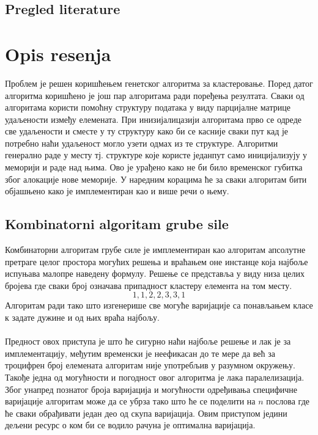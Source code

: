 \documentclass{article}
\begin{document}
\subsection{Pregled literature}

\newpage
\section{Opis resenja}
Проблем је решен коришћењем генетског алгоритма за кластеровање. Поред датог алгоритма коришћено је још пар алгоритама ради поређења резултата. Сваки од алгоритама користи помоћну структуру података у виду парцијалне матрице удаљености између елемената. При инизијалицазији алгоритама прво се одреде све удаљености и сместе у ту структуру како би се касније сваки пут кад је потребно наћи удаљеност могло узети одмах из те структуре. Алгоритми генерално раде у месту тј. структуре које користе једанпут само иницијализују у меморији и раде над њима. Ово је урађено како не би било временског губитка због алокације нове меморије. У наредним корацима ће за сваки алгоритам бити објашњено како је имплементиран као и више речи о њему.

\subsection{Kombinatorni algoritam grube sile}
Комбинаторни алгоритам грубе силе је имплементиран као алгоритам апсолутне претраге целог простора могућих решења и враћањем оне инстанце која најбоље испуњава малопре наведену формулу.
Решење се представља у виду низа целих бројева где сваки број означава припадност кластеру елемента на том месту.
\begin{displaymath}
1,1,2,2,3,3,1
\end{displaymath}
Алгоритам ради тако што изгенерише све могуће варијације са понављањем класе к задате дужине и од њих враћа најбољу.
\\\\Предност овох приступа је што ће сигурно наћи најбоље решење и лак је за имплементацију, међутим временски је неефикасан до те мере да већ за троцифрен број елемената алгоритам није употребљив у разумном окружењу.
Такође једна од могућности и погодност овог алгоритма је лака паралелизација.
Због унапред познатог броја варијација и могућности одређивања специфичне варијације алгоритам може да се убрза тако што ће се поделити на $n$ послова где ће сваки обрађивати један део од скупа варијација.
Овим приступом једини дељени ресурс о ком би се водило рачуна је оптимална варијација.
\end{document}
